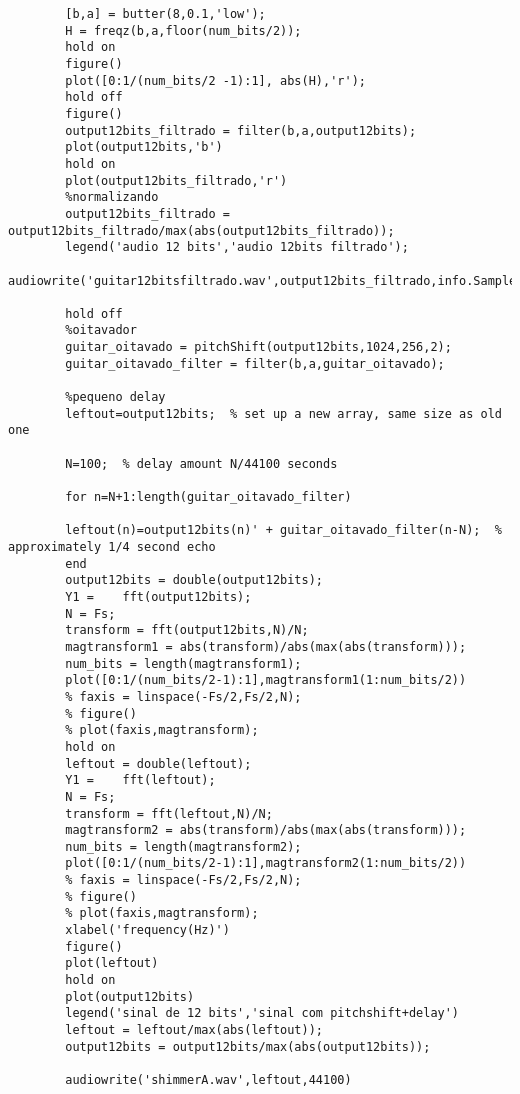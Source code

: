 \begin{lstlisting}[caption={Code: "audio.m":Código Matlab para a realização da análise espectral do efeito shimmer em um sinal de áudio de 12bits/44100Hz},label={codigo01}]
		%projetar o filtro
		[b,a] = butter(8,0.1,'low');
		H = freqz(b,a,floor(num_bits/2));
		hold on
		figure()
		plot([0:1/(num_bits/2 -1):1], abs(H),'r');
		hold off
		figure()
		output12bits_filtrado = filter(b,a,output12bits);
		plot(output12bits,'b')
		hold on
		plot(output12bits_filtrado,'r')
		%normalizando
		output12bits_filtrado = output12bits_filtrado/max(abs(output12bits_filtrado));
		legend('audio 12 bits','audio 12bits filtrado');
		audiowrite('guitar12bitsfiltrado.wav',output12bits_filtrado,info.SampleRate);
		
		hold off
		%oitavador
		guitar_oitavado = pitchShift(output12bits,1024,256,2);
		guitar_oitavado_filter = filter(b,a,guitar_oitavado);
		
		%pequeno delay
		leftout=output12bits;  % set up a new array, same size as old one
		
		N=100;  % delay amount N/44100 seconds
		
		for n=N+1:length(guitar_oitavado_filter)
		
		leftout(n)=output12bits(n)' + guitar_oitavado_filter(n-N);  % approximately 1/4 second echo
		end
		output12bits = double(output12bits);
		Y1 =    fft(output12bits);
		N = Fs;
		transform = fft(output12bits,N)/N;
		magtransform1 = abs(transform)/abs(max(abs(transform)));
		num_bits = length(magtransform1);
		plot([0:1/(num_bits/2-1):1],magtransform1(1:num_bits/2))
		% faxis = linspace(-Fs/2,Fs/2,N);
		% figure()
		% plot(faxis,magtransform);
		hold on
		leftout = double(leftout);
		Y1 =    fft(leftout);
		N = Fs;
		transform = fft(leftout,N)/N;
		magtransform2 = abs(transform)/abs(max(abs(transform)));
		num_bits = length(magtransform2);
		plot([0:1/(num_bits/2-1):1],magtransform2(1:num_bits/2))
		% faxis = linspace(-Fs/2,Fs/2,N);
		% figure()
		% plot(faxis,magtransform);
		xlabel('frequency(Hz)')
		figure()
		plot(leftout)
		hold on
		plot(output12bits)
		legend('sinal de 12 bits','sinal com pitchshift+delay')
		leftout = leftout/max(abs(leftout));
		output12bits = output12bits/max(abs(output12bits));
		
		audiowrite('shimmerA.wav',leftout,44100)
	\end{lstlisting}
	
